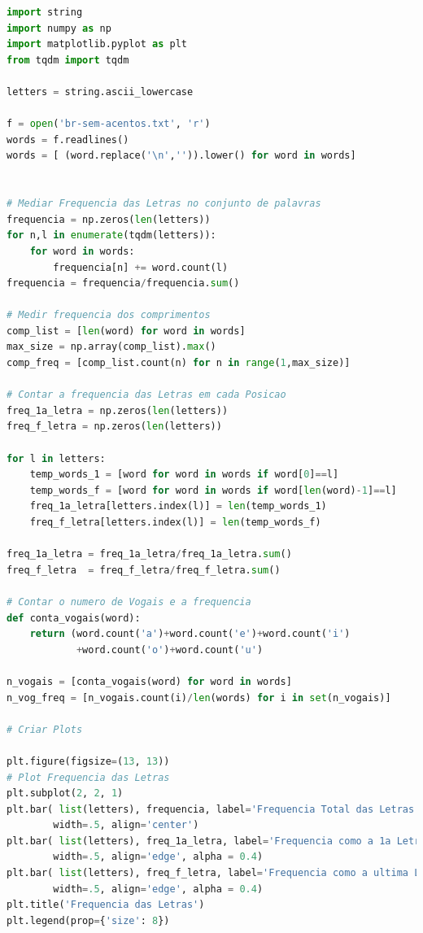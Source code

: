 \begin{lstlisting}[language=Python, frame=lines,basicstyle=\footnotesize, caption={Estatísticas das palavras da Lingua Portuguesa}, label={lst:est-palavras}]
import string
import numpy as np
import matplotlib.pyplot as plt
from tqdm import tqdm

letters = string.ascii_lowercase

f = open('br-sem-acentos.txt', 'r')
words = f.readlines()
words = [ (word.replace('\n','')).lower() for word in words]


# Mediar Frequencia das Letras no conjunto de palavras
frequencia = np.zeros(len(letters))
for n,l in enumerate(tqdm(letters)):
    for word in words:
        frequencia[n] += word.count(l)
frequencia = frequencia/frequencia.sum()

# Medir frequencia dos comprimentos
comp_list = [len(word) for word in words]
max_size = np.array(comp_list).max()
comp_freq = [comp_list.count(n) for n in range(1,max_size)]

# Contar a frequencia das Letras em cada Posicao
freq_1a_letra = np.zeros(len(letters))
freq_f_letra = np.zeros(len(letters))

for l in letters:
    temp_words_1 = [word for word in words if word[0]==l]
    temp_words_f = [word for word in words if word[len(word)-1]==l]
    freq_1a_letra[letters.index(l)] = len(temp_words_1)
    freq_f_letra[letters.index(l)] = len(temp_words_f)
    
freq_1a_letra = freq_1a_letra/freq_1a_letra.sum()
freq_f_letra  = freq_f_letra/freq_f_letra.sum()

# Contar o numero de Vogais e a frequencia
def conta_vogais(word):
    return (word.count('a')+word.count('e')+word.count('i')
            +word.count('o')+word.count('u')

n_vogais = [conta_vogais(word) for word in words]
n_vog_freq = [n_vogais.count(i)/len(words) for i in set(n_vogais)]

# Criar Plots

plt.figure(figsize=(13, 13))
# Plot Frequencia das Letras
plt.subplot(2, 2, 1)
plt.bar( list(letters), frequencia, label='Frequencia Total das Letras',
        width=.5, align='center')
plt.bar( list(letters), freq_1a_letra, label='Frequencia como a 1a Letra',
        width=.5, align='edge', alpha = 0.4)
plt.bar( list(letters), freq_f_letra, label='Frequencia como a ultima Letra',
        width=.5, align='edge', alpha = 0.4)
plt.title('Frequencia das Letras')
plt.legend(prop={'size': 8})


\end{lstlisting}
